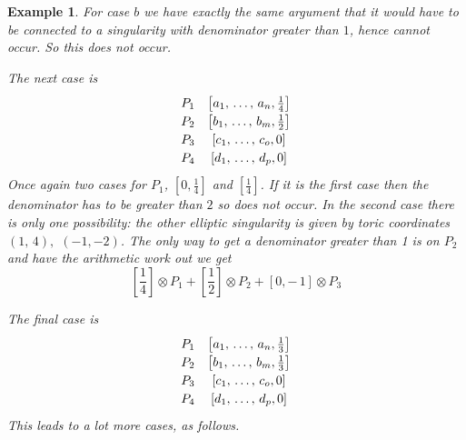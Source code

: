 \documentclass[11pt]{amsart}
\theoremstyle{plain}
\newtheorem{ex}[thm]{Example}
\begin{document}
\begin{ex}
For case $b$ we have exactly the same argument that it would have to be connected to a singularity with denominator greater than $1$, hence cannot occur. So this does not occur. 


The next case is 
\[\def\arraystretch{1.2}
\begin{array}{cc}
P_1 & \left[ a_1, \, \dots , \, a_n, \frac{1}{4} \right] \\ 
P_2 & \left[b_1 , \, \dots, \, b_m, \frac{1}{2} \right] \\
P_3 & \left[c_1, \, \dots, \, c_o, 0\right] \\
P_4 & \left[d_1, \, \dots, \, d_p, 0\right]  \\
\end{array}
\]
Once again two cases for $P_1$,  $[0, \frac{1}{4}]$ and $[\frac{1}{4}]$. If it is the first case then the denominator has to be greater than $2$ so does not occur. In the second case there is only one possibility: the other elliptic singularity is given by toric coordinates $(1, \, 4),$ $(-1, -2)$. The only way to get a denominator greater than 1 is on $P_2$ and have the arithmetic work out we get
\[
[\frac{1}{4}] \otimes P_1 + [\frac{1}{2}] \otimes P_2 + [0, -\, 1] \otimes P_3
\]

The final case is 
\[\def\arraystretch{1.2}
\begin{array}{cc}
P_1 & \left[ a_1, \, \dots , \, a_n, \frac{1}{3} \right] \\ 
P_2 & \left[b_1 , \, \dots, \, b_m, \frac{1}{3} \right] \\
P_3 & \left[c_1, \, \dots, \, c_o, 0\right] \\
P_4 & \left[d_1, \, \dots, \, d_p, 0\right]  \\
\end{array}
\]
This leads to a lot more cases, as follows.
\end{ex}
\end{document}
